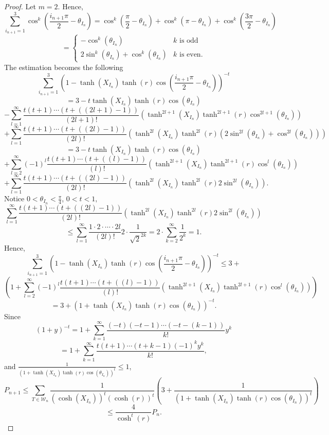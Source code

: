 \documentclass[12pt,oneside]{sfsuthesis}
\theoremstyle{plain} %
\theoremstyle{definition}  %
\theoremstyle{remark}  %
\theoremstyle{plain}
\begin{document}
{\begin{proof}
Let $m=2$. Hence,
$$
\sum_{i_{n+1}=1}^{3} \cos^k\left(\frac{i_{n+1} \pi}{2}-\theta_{I_n} \right)=\cos^k\left(\frac{\pi}{2}-\theta_{I_n}\right)+\cos^k\left(\pi-\theta_{I_n}\right)+\cos^k\left(\frac{3 \pi}{2}-\theta_{I_n}\right)
$$
$$
=\begin{cases} 
      -\cos^k\left(\theta_{I_n}\right) & k \text{ is odd }  \\
      2\sin^k\left(\theta_{I_n}\right)+\cos^k\left(\theta_{I_n}\right) & k\text{ is even.} 
   \end{cases}
$$
The estimation becomes the following
$$
\sum_{i_{n+1}=1}^{3}\left(1-\tanh\left(X_{I_n}\right)\tanh\left(r\right)\cos\left(\frac{i_{n+1}\pi}{2}-\theta_{I_{n}}\right)\right)^{-t}
$$
$$
=3-t\tanh\left(X_{I_n} \right)\tanh\left(r\right)\cos\left(\theta_{I_n}\right)
$$
$$
-\sum_{l=1}^{\infty}\frac{t\left(t+1\right)\cdots\left(t+\left((2l+1)-1\right)\right)}{\left(2l+1\right)!}
\left( 
\tanh^{2l+1}\left(X_{I_n}\right)\tanh^{2l+1}\left(r\right)\cos^{2l+1}\left(\theta_{I_n}\right)
\right)
$$
$$
+\sum_{l=1}^{\infty}\frac{t\left(t+1\right)\cdots\left(t+\left((2l)-1\right)\right)}{\left(2l\right)!}
\left( 
\tanh^{2l}\left(X_{I_n}\right)\tanh^{2l}\left(r\right)\left(2\sin^{2l}\left(\theta_{I_n}\right)+\cos^{2l}\left(\theta_{I_n}\right)\right)
\right)
$$
$$
=3-t\tanh\left(X_{I_n} \right)\tanh\left(r\right)\cos\left(\theta_{I_n}\right)
$$
$$
+\sum_{l=2}^{\infty}(-1)^l\frac{t\left(t+1\right)\cdots\left(t+\left((l)-1\right)\right)}{\left(l\right)!}
\left( 
\tanh^{2l+1}\left(X_{I_n}\right)\tanh^{2l+1}\left(r\right)\cos^{l}\left(\theta_{I_n}\right)
\right)
$$
$$
+\sum_{l=1}^{\infty}\frac{t\left(t+1\right)\cdots\left(t+\left((2l)-1\right)\right)}{\left(2l\right)!}
\left( 
\tanh^{2l}\left(X_{I_n}\right)\tanh^{2l}\left(r\right)2\sin^{2l}\left(\theta_{I_n}\right)
\right).
$$
Notice $0<\theta_{I_n}<\frac{\pi}{4}$, $0<t<1,$
$$
\sum_{l=1}^{\infty}\frac{t\left(t+1\right)\cdots\left(t+\left((2l)-1\right)\right)}{\left(2l\right)!}
\left( 
\tanh^{2l}\left(X_{I_n}\right)\tanh^{2l}\left(r\right)2\sin^{2l}\left(\theta_{I_n}\right)
\right)
$$
$$
\leq \sum_{l=1}^\infty \frac{1\cdot 2\cdot \cdots \cdot 2l}{(2l)!}2\cdot \frac{1}{\sqrt{2}^{2k}}=2\cdot \sum_{k=2}^\infty\frac{1}{2^k}=1.
$$
Hence, 
$$
\sum_{i_{n+1}=1}^{3}\left(1-\tanh\left(X_{I_n}\right)\tanh\left(r\right)\cos\left(\frac{i_{n+1}\pi}{2}-\theta_{I_{n}}\right)\right)^{-t}\leq 3+
$$
$$
\left(1+\sum_{l=2}^{\infty}(-1)^l\frac{t\left(t+1\right)\cdots\left(t+\left((l)-1\right)\right)}{\left(l\right)!}
\left( 
\tanh^{2l+1}\left(X_{I_n}\right)\tanh^{2l+1}\left(r\right)\cos^{l}\left(\theta_{I_n}\right)
\right)
\right)
$$
$$
=3+\left(1+\tanh\left(X_{I_n}\right)\tanh\left(r\right)\cos\left(\theta_{I_n}\right)\right)^{-t}.
$$
Since
$$
\left(1+y\right)^{-t}=1+\sum_{k=1}^\infty\frac{(-t)(-t-1)\cdots (-t-(k-1))}{k!}y^k
$$
$$
=1+\sum_{k=1}^\infty\frac{t(t+1)\cdots(t+k-1)(-1)^k y^k}{k!},
$$ 
and $\frac{1}{\left(1+\tanh\left(X_{I_n}\right)\tanh\left(r\right)\cos\left(\theta_{I_n}\right)\right)^t}\leq 1$,
$$
P_{n+1}\leq \sum_{T\in\mathcal{W}_n}\frac{1}{\left(\cosh\left(X_{I_n}\right)\right)^t\left(\cosh\left(r\right)\right)^t}\left(3+\frac{1}{\left(1+\tanh\left(X_{I_n}\right)\tanh\left(r\right)\cos\left(\theta_{I_n}\right)\right)^t}\right)
$$
$$
\leq \frac{4}{\cosh^t\left(r\right)}P_{n}.
$$



\end{proof}}
\end{document}
